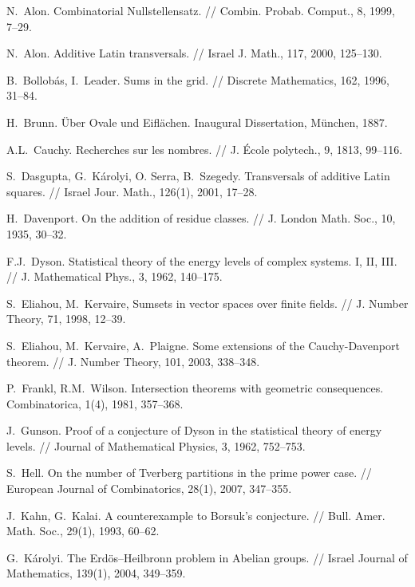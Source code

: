\documentclass[12pt,a4paper]{amsart}
\theoremstyle{definition}
\theoremstyle{remark}
\begin{document}
\begin{thebibliography}{99}

N.~Alon. Combinatorial Nullstellensatz. // Combin. Probab. Comput., 8, 1999, 7--29.

N.~Alon.  Additive Latin transversals. // Israel J. Math., 117, 2000, 125--130.

B.~Bollob\'as, I.~Leader. Sums in the grid. // Discrete Mathematics, 162, 1996, 31--84.

H.~Brunn. \"Uber Ovale und Eifl\"achen. Inaugural Dissertation, M\"unchen, 1887.

A.L.~Cauchy. Recherches sur les nombres. // J. \'Ecole polytech., 9, 1813, 99--116.

S.~Dasgupta, G.~K\'arolyi, O. Serra, B.~Szegedy. Transversals of additive Latin squares. // Israel Jour. Math., 126(1), 2001, 17--28.

H.~Davenport. On the addition of residue classes. // J. London Math. Soc., 10, 1935, 30--32.

F.J.~Dyson. Statistical theory of the energy levels of complex systems. I, II, III. // J. Mathematical Phys., 3, 1962, 140--175.

S.~Eliahou, M.~Kervaire, Sumsets in vector spaces over finite fields. // J. Number Theory, 71, 1998, 12--39.

S.~Eliahou, M.~Kervaire, A.~Plaigne. Some extensions of the Cauchy-Davenport theorem. // J. Number Theory, 101, 2003, 338--348.

P.~Frankl, R.M.~Wilson. Intersection theorems with geometric consequences. Combinatorica, 1(4), 1981, 357--368.

J.~Gunson. Proof of a conjecture of Dyson in the statistical theory of energy levels. // Journal of Mathematical Physics, 3, 1962, 752--753.

S.~Hell. On the number of Tverberg partitions in the prime power case. // European Journal of Combinatorics, 28(1), 2007, 347--355.

J.~Kahn, G.~Kalai. A counterexample to Borsuk's conjecture. // Bull. Amer. Math. Soc., 29(1), 1993, 60--62.

G.~K\'arolyi. The Erd\"os--Heilbronn problem in Abelian groups. // 
Israel Journal of Mathematics, 139(1), 2004, 349--359.


\end{thebibliography}
\end{document}
